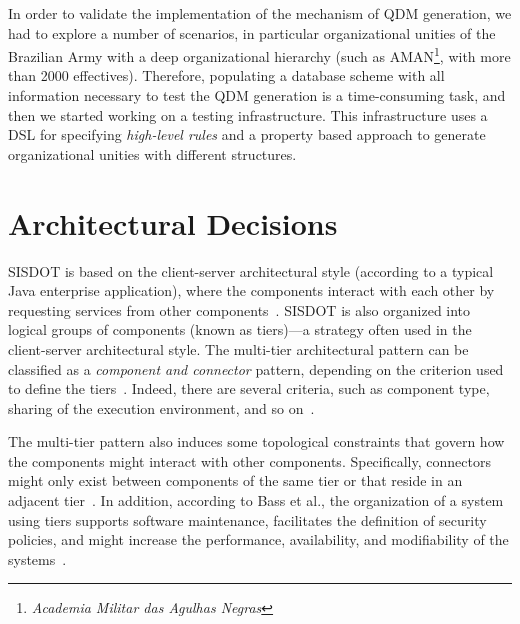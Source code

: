 \documentclass[AMA,STIX1COL,hidelinks]{WileyNJD-v2}
\newcommand{\callers}{\emph{high-level rules}\xspace}
\begin{document}
In order to validate the implementation of
the mechanism of QDM generation, we had to
explore a number of scenarios, in particular
organizational unities of the Brazilian Army
with a deep organizational hierarchy (such as
AMAN\footnote{\emph{Academia Militar das Agulhas Negras}},
with more than 2000 effectives). Therefore, populating
a database scheme with all information necessary
to test the QDM generation is a time-consuming task,
and then we started working on a testing infrastructure.
This infrastructure uses a DSL for specifying \callers and
a property based approach to generate organizational
unities with different structures. 






\section{Architectural Decisions}
\label{sec:architecture} 

SISDOT is based on the client-server architectural style (according to a typical Java enterprise application), where the components interact with each other by requesting services from other components~\cite{clements2011documenting}. SISDOT is also organized into logical groups of components (known as tiers)---a strategy often used in the client-server architectural style. The multi-tier architectural pattern can be classified as a \emph{component and connector} pattern, depending on the criterion used to define the tiers~\cite{bass2013software}. Indeed, there are several criteria, such as component type, sharing of the execution environment, 
and so on~\cite{clements2011documenting}.

The multi-tier pattern also induces some topological constraints that govern how the components might interact with other components. Specifically, connectors might only exist between components of the same tier or that reside in an adjacent tier~\cite{clements2011documenting}. In addition, according to Bass et al., the organization of a system using tiers supports software maintenance, facilitates the definition of security policies, and might increase the performance, availability, and modifiability of the systems~\cite{bass2013software}. 
\end{document}

